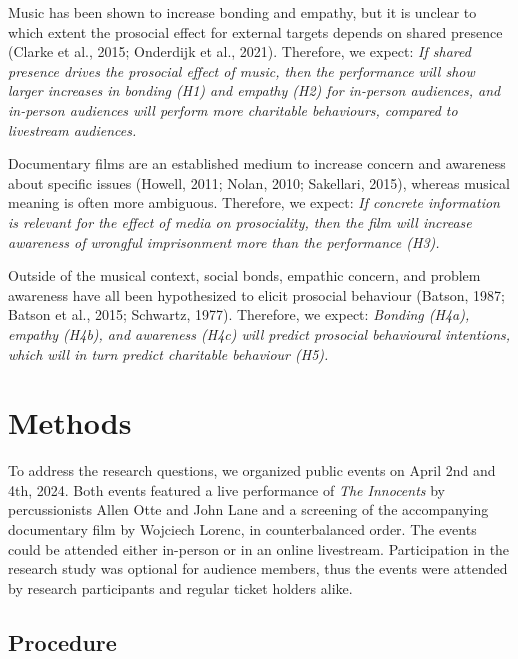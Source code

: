 \documentclass[
  man,floatsintext]{apa6}
\begin{document}
Music has been shown to increase bonding and empathy, but it is unclear to which extent the prosocial effect for external targets depends on shared presence (Clarke et al., 2015; Onderdijk et al., 2021). Therefore, we expect: \emph{If shared presence drives the prosocial effect of music, then the performance will show larger increases in bonding (H1) and empathy (H2) for in-person audiences, and in-person audiences will perform more charitable behaviours, compared to livestream audiences.}

Documentary films are an established medium to increase concern and awareness about specific issues (Howell, 2011; Nolan, 2010; Sakellari, 2015), whereas musical meaning is often more ambiguous. Therefore, we expect: \emph{If concrete information is relevant for the effect of media on prosociality, then the film will increase awareness of wrongful imprisonment more than the performance (H3).}

Outside of the musical context, social bonds, empathic concern, and problem awareness have all been hypothesized to elicit prosocial behaviour (Batson, 1987; Batson et al., 2015; Schwartz, 1977). Therefore, we expect: \emph{Bonding (H4a), empathy (H4b), and awareness (H4c) will predict prosocial behavioural intentions, which will in turn predict charitable behaviour (H5).}

\section{Methods}\label{methods}

To address the research questions, we organized public events on April 2nd and 4th, 2024. Both events featured a live performance of \textit{The Innocents} by percussionists Allen Otte and John Lane and a screening of the accompanying documentary film by Wojciech Lorenc, in counterbalanced order. The events could be attended either in-person or in an online livestream. Participation in the research study was optional for audience members, thus the events were attended by research participants and regular ticket holders alike.

\subsection{Procedure}\label{procedure}
\end{document}

